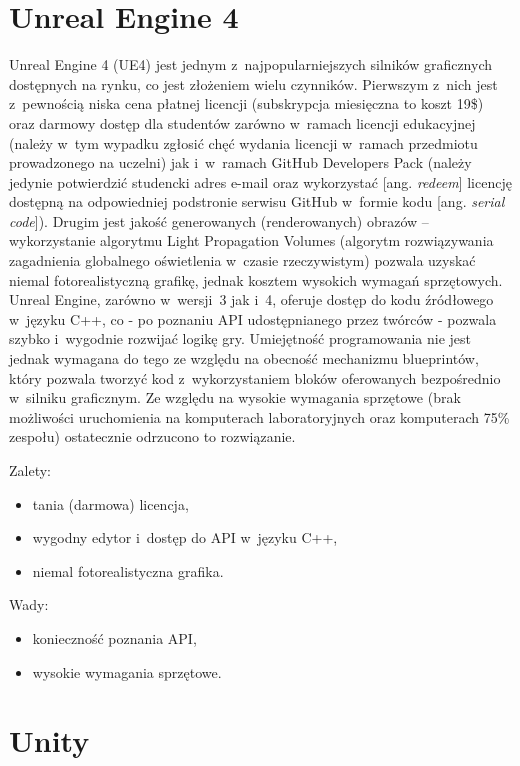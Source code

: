 \section{Unreal Engine 4}
Unreal Engine 4 (UE4) jest jednym z~najpopularniejszych silników graficznych dostępnych na rynku, co jest złożeniem wielu czynników. Pierwszym z~nich jest z~pewnością niska cena płatnej licencji (subskrypcja miesięczna to koszt 19\$) oraz darmowy dostęp dla studentów zarówno w~ramach licencji edukacyjnej (należy w~tym wypadku zgłosić chęć wydania licencji w~ramach przedmiotu prowadzonego na uczelni) jak i~w~ramach GitHub Developers Pack (należy jedynie potwierdzić studencki adres e-mail oraz wykorzystać [ang. \emph{redeem}] licencję dostępną na odpowiedniej podstronie serwisu GitHub w~formie kodu [ang. \emph{serial code}]). Drugim jest jakość generowanych (renderowanych) obrazów -- wykorzystanie algorytmu Light Propagation Volumes (algorytm rozwiązywania zagadnienia globalnego oświetlenia w~czasie rzeczywistym) pozwala uzyskać niemal fotorealistyczną grafikę, jednak kosztem wysokich wymagań sprzętowych.
Unreal Engine, zarówno w~wersji~3 jak i~4, oferuje dostęp do kodu źródłowego w~języku C++, co - po poznaniu API udostępnianego przez twórców - pozwala szybko i~wygodnie rozwijać logikę gry. Umiejętność programowania nie jest jednak wymagana do tego ze względu na obecność mechanizmu blueprintów, który pozwala tworzyć kod z~wykorzystaniem bloków oferowanych bezpośrednio w~silniku graficznym.
Ze względu na wysokie wymagania sprzętowe (brak możliwości uruchomienia na komputerach laboratoryjnych oraz komputerach 75\% zespołu) ostatecznie odrzucono to rozwiązanie.\\

{\raggedright Zalety:
\begin{itemize}
\item tania (darmowa) licencja,
\item wygodny edytor i~dostęp do API w~języku C++,
\item niemal fotorealistyczna grafika.
\end{itemize}

Wady:
\begin{itemize}
\item konieczność poznania API,
\item wysokie wymagania sprzętowe.
\end{itemize}
}
\section{Unity}

